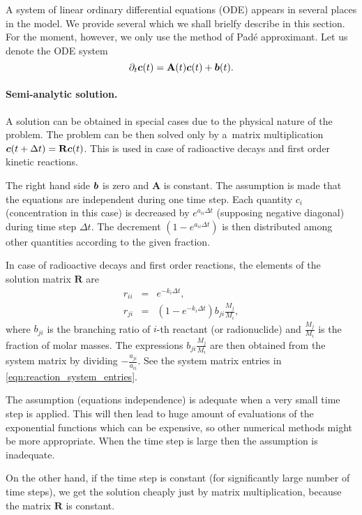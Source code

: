 A system of linear ordinary differential equations (ODE) appears in several places in the model. We provide 
several  which we shall brielfy describe in this section. For the moment, however, we only use the method of Pad\'e approximant.
Let us denote 
the ODE system
\[
  \partial_t \mathbf{\boldsymbol{c}}(t) = \mathbf{A}(t) \mathbf{\boldsymbol{c}}(t) + \mathbf{\boldsymbol{b}}(t).
\]

\paragraph{Semi-analytic solution.}
A  solution can be obtained in special cases due to the physical nature of the problem.
The problem can be then solved only by a~matrix multiplication $\mathbf{\boldsymbol{c}}(t+\Delta t) = \mathbf{R} \mathbf{\boldsymbol{c}}(t)$. 
This is used in case of radioactive decays and first order kinetic reactions.

The right hand side $\mathbf{\boldsymbol{b}}$ is zero and $\mathbf{A}$ is constant. The assumption is made that the equations 
are independent during one time step. Each quantity $c_i$ (concentration in this case) is decreased 
by $e^{a_{ii} \Delta t}$ (supposing negative diagonal) during time step $\Delta t$. The decrement $\left( 1-e^{a_{ii} \Delta t} \right)$
is then distributed among other quantities according to the given fraction.

In case of radioactive decays and first order reactions, the elements of the solution matrix $\mathbf{R}$ are
\begin{eqnarray*}
     r_{ii} &=& e^{-k_i \Delta t}, \\
     r_{ji} &=& \left( 1-e^{-k_i \Delta t} \right) b_{ji} \frac{M_j}{M_i},
\end{eqnarray*}
where $b_{ji}$ is the branching ratio of $i$-th reactant (or radionuclide) and $\frac{M_j}{M_i}$ is 
the fraction of molar masses.
The expressions $b_{ji} \frac{M_j}{M_i}$ are then obtained from the system matrix by dividing 
$-\frac{a_{ji}}{a_{ii}}$. See the system matrix entries in \eqref{eqn:reaction_system_entries}.

The assumption (equations independence) is adequate when a very small time step is applied. This will then lead 
to huge amount of evaluations of the exponential functions which can be expensive, so other numerical methods 
might be more appropriate. When the time step is large then the assumption is inadequate.

On the other hand, if the time step is constant (for significantly large number of time steps), we get the
solution cheaply just by matrix multiplication, because the matrix $\mathbf{R}$ is constant.


